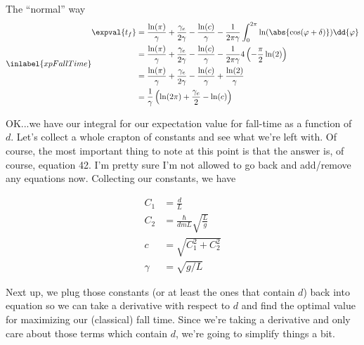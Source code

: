 \begin{answer}
\begin{answerpart}{The ``normal'' way}
    \begin{equation}
      \inlabel{xpFallTime}
      \begin{split}
        \expval{t_f}
        &=
        \frac{\ln(\pi)}{\gamma}
        +
        \frac{\gamma_e}{2\gamma}
        -
        \frac{\ln(c)}{\gamma}
        -
        \frac{1}{2\pi\gamma}
        \int_{0}^{2\pi}
        \ln(\abs{\cos(\varphi + \delta)})
        \dd{\varphi}
        \\
        &=
        \frac{\ln(\pi)}{\gamma}
        +
        \frac{\gamma_e}{2\gamma}
        -
        \frac{\ln(c)}{\gamma}
        -
        \frac{1}{2\pi\gamma}
        4\left(-\frac{\pi}{2}\ln(2)\right)
        \\
        &=
        \frac{\ln(\pi)}{\gamma}
        +
        \frac{\gamma_e}{2\gamma}
        -
        \frac{\ln(c)}{\gamma}
        +
        \frac{\ln(2)}{\gamma}
        \\
        &=
        \frac{1}{\gamma}
        \left(
        \ln(2\pi)
        +
        \frac{\gamma_e}{2}
        -
        \ln(c)
        \right)
        \\
      \end{split}
    \end{equation}

    OK...we have our integral for our expectation value for fall-time
    as a function of $d$.  Let's collect a whole crapton of constants
    and see what we're left with.  Of course, the most important thing
    to note at this point is that the answer is, of course, equation
    42.  I'm pretty sure I'm not allowed to go back and add/remove any
    equations now.  Collecting our constants, we have

    \begin{equation}
      \begin{split}
        C_1 &= \frac{d}{L}\\
        C_2 &= \frac{\hbar}{dmL}\sqrt{\frac{L}{g}}\\
        c &= \sqrt{C_1^2 + C_2^2}\\
        \gamma &= \sqrt{g/L}
      \end{split}
    \end{equation}

    Next up, we plug those constants (or at least the ones that
    contain $d$) back into equation  so we can take a
    derivative with respect to $d$ and find the optimal value for
    maximizing our (classical) fall time.  Since we're taking a
    derivative and only care about those terms which contain $d$,
    we're going to simplify things a bit.


\end{answerpart}
\end{answer}
